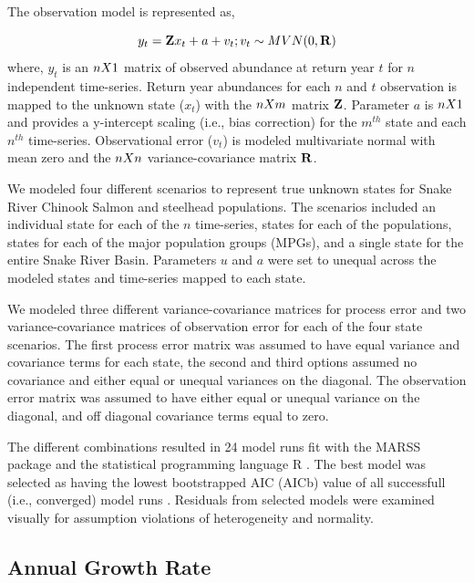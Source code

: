 \documentclass[10pt,a4paper]{article}
\begin{document}
The observation model is represented as,

\[
y_t = \mathbf{Z}x_t + a + v_t; \\
v_t \sim MVN(0,\mathbf{R})
\]
where, \(y_t\) is an \(n \space X \space 1\) matrix of observed abundance at return year \(t\) for \(n\) independent time-series. Return year abundances for each \(n\) and \(t\) observation is mapped to the unknown state (\(x_t\)) with the \(n \space X \space m\) matrix \(\bf{Z}\). Parameter \(a\) is \(n \space X \space 1\) and provides a y-intercept scaling (i.e., bias correction) for the \(m^{th}\) state and each \(n^{th}\) time-series. Observational error (\(v_t\)) is modeled multivariate normal with mean zero and the \(n \space X \space n\) variance-covariance matrix \(\bf{R}\).

We modeled four different scenarios to represent true unknown states for Snake River Chinook Salmon and steelhead populations. The scenarios included an individual state for each of the \(n\) time-series, states for each of the populations, states for each of the major population groups (MPGs), and a single state for the entire Snake River Basin. Parameters \(u\) and \(a\) were set to unequal across the modeled states and time-series mapped to each state.

We modeled three different variance-covariance matrices for process error and two variance-covariance matrices of observation error for each of the four state scenarios. The first process error matrix was assumed to have equal variance and covariance terms for each state, the second and third options assumed no covariance and either equal or unequal variances on the diagonal. The observation error matrix was assumed to have either equal or unequal variance on the diagonal, and off diagonal covariance terms equal to zero.

The different combinations resulted in 24 model runs fit with the MARSS package \autocite{holmes_marss_2012} and the statistical programming language R \autocite{R-base}. The best model was selected as having the lowest bootstrapped AIC (AICb) value of all successfull (i.e., converged) model runs \autocite{holmes_marss_2012,R-MARSS}. Residuals from selected models were examined visually for assumption violations of heterogeneity and normality.

\subsection{Annual Growth Rate}\label{annual-growth-rate}
\end{document}
